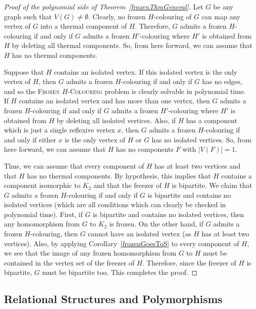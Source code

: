 \documentclass[11 pt]{amsart}
\theoremstyle{definition}
\theoremstyle{case}
\numberwithin{equation}{section}
\newcommand\Hfrz[1]{\textsc{Frozen $#1$-Colouring}}
\begin{document}
\begin{proof}[Proof of the polynomial side of Theorem~\ref{frozenThmGeneral}]
Let $G$ be any graph such that $V(G)\neq \emptyset$. Clearly, no frozen $H$-colouring of $G$ can map any vertex of $G$ into a thermal component of $H$. Therefore, $G$ admits a frozen $H$-colouring if and only if $G$ admits a frozen $H'$-colouring where $H'$ is obtained from $H$ by deleting all thermal components. So, from here forward, we can assume that $H$ has no thermal components. 

Suppose that $H$ contains an isolated vertex. If this isolated vertex is the only vertex of $H$, then $G$ admits a frozen $H$-colouring if and only if $G$ has no edges, and so the \Hfrz{H} problem is clearly solvable in polynomial time. If $H$ contains an isolated vertex and has more than one vertex, then $G$ admits a frozen $H$-colouring if and only if $G$ admits a frozen $H'$-colouring where $H'$ is obtained from $H$ by deleting all isolated vertices. Also, if $H$ has a component which is just a single reflexive vertex $x$, then $G$ admits a frozen $H$-colouring if and only if either $x$ is the only vertex of $H$ or $G$ has no isolated vertices. So, from here forward, we can assume that $H$ has no components $F$ with $|V(F)|=1$.

Thus, we can assume that every component of $H$ has at least two vertices and that $H$ has no thermal components. By hypothesis, this implies that $H$ contains a component isomorphic to $K_2$ and that the freezer of $H$ is bipartite. We claim that $G$ admits a frozen $H$-colouring if and only if $G$ is bipartite and contains no isolated vertices (which are all conditions which can clearly be checked in polynomial time). First, if $G$ is bipartite and contains no isolated vertices, then any homomorphism from $G$ to $K_2$ is frozen. On the other hand, if $G$ admits a frozen $H$-colouring, then $G$ cannot have an isolated vertex (as $H$ has at least two vertices). Also, by applying Corollary~\ref{frozenGoesToS} to every component of $H$, we see that the image of any frozen homomorphism from $G$ to $H$ must be contained in the vertex set of the freezer of $H$. Therefore, since the freezer of $H$ is  bipartite, $G$ must be bipartite too. This completes the proof. 
\end{proof}



\subsection{Relational Structures and Polymorphisms}
\end{document}
